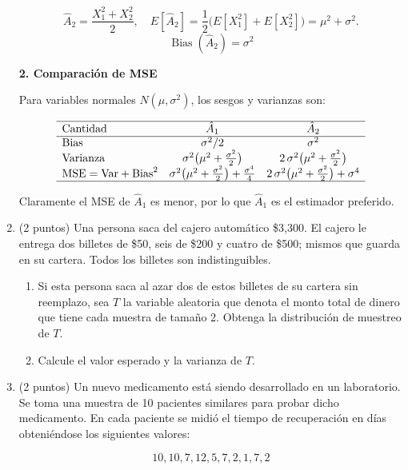 \documentclass[12pt]{article}
\begin{document}
\begin{enumerate}
\[
\hat A_{2}= \frac{X_{1}^{2}+X_{2}^{2}}{2},\quad
E[\hat A_{2}]
=\frac{1}{2}\bigl(E[X_{1}^{2}]+E[X_{2}^{2}]\bigr)
=\mu^{2}+\sigma^{2}.
\]
\[
\boxed{\operatorname{Bias}(\hat A_{2})=\sigma^{2}}
\]

\medskip
\textbf{2. Comparación de MSE}

Para variables normales \(N(\mu,\sigma^{2})\), los sesgos y varianzas son:

\[
\begin{array}{lcc}
\hline
\text{Cantidad} & \hat A_{1} & \hat A_{2} \\
\hline
\text{Bias}  & \sigma^{2}/2 & \sigma^{2} \\
\text{Varianza} & \sigma^{2}\bigl(\mu^{2}+\tfrac{\sigma^{2}}{2}\bigr)
               & 2\,\sigma^{2}\bigl(\mu^{2}+\tfrac{\sigma^{2}}{2}\bigr) \\
\text{MSE} = \mathrm{Var} + \mathrm{Bias}^{2}
               & \sigma^{2}\bigl(\mu^{2}+\tfrac{\sigma^{2}}{2}\bigr)+\tfrac{\sigma^{4}}{4}
               & 2\,\sigma^{2}\bigl(\mu^{2}+\tfrac{\sigma^{2}}{2}\bigr)+\sigma^{4} \\
\hline
\end{array}
\]

Claramente el MSE de \(\hat A_{1}\) es menor, por lo que \(\hat A_{1}\) es el estimador preferido.

	\item (2 puntos) Una persona saca del cajero automático \$3,300. El cajero le entrega dos billetes de \$50, seis de \$200 y cuatro de \$500; mismos que guarda en su cartera. Todos los billetes son indistinguibles.

	      \begin{enumerate}
		      \item Si esta persona saca al azar dos de estos billetes de su cartera sin reemplazo,
		            sea $T$ la variable aleatoria que denota el monto total de dinero que tiene
		            cada muestra de tamaño 2. Obtenga la distribución de muestreo de $T$.
		      \item Calcule el valor esperado y la varianza de $T$.
	      \end{enumerate}

	\item (2 puntos) Un nuevo medicamento está siendo desarrollado en un laboratorio. Se toma una muestra de 10 pacientes similares para probar dicho medicamento. En cada paciente se midió el tiempo de recuperación en días obteniéndose los siguientes valores:

	      \[
		      10, 10, 7, 12, 5, 7, 2, 1, 7, 2
	      \]


\end{enumerate}
\end{document}
